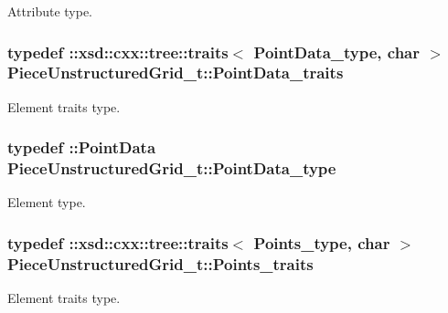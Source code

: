 Attribute type. 

\hypertarget{classPieceUnstructuredGrid__t_aee3c7ac7c46c4ebc9f248d31c458d300}{
\subsubsection[{Point\-Data\-\_\-traits}]{\setlength{\rightskip}{0pt plus 5cm}typedef \-::xsd\-::cxx\-::tree\-::traits$<$ {\bf Point\-Data\-\_\-type}, char $>$ {\bf Piece\-Unstructured\-Grid\-\_\-t\-::\-Point\-Data\-\_\-traits}}}\label{classPieceUnstructuredGrid__t_aee3c7ac7c46c4ebc9f248d31c458d300}


Element traits type. 

\hypertarget{classPieceUnstructuredGrid__t_a5d79d8ea03ca53f80f24e62c2175ec02}{
\subsubsection[{Point\-Data\-\_\-type}]{\setlength{\rightskip}{0pt plus 5cm}typedef \-::{\bf Point\-Data} {\bf Piece\-Unstructured\-Grid\-\_\-t\-::\-Point\-Data\-\_\-type}}}\label{classPieceUnstructuredGrid__t_a5d79d8ea03ca53f80f24e62c2175ec02}


Element type. 

\hypertarget{classPieceUnstructuredGrid__t_abdfd9c9f9eb5f43bd4cfcb2fad6d9f63}{
\subsubsection[{Points\-\_\-traits}]{\setlength{\rightskip}{0pt plus 5cm}typedef \-::xsd\-::cxx\-::tree\-::traits$<$ {\bf Points\-\_\-type}, char $>$ {\bf Piece\-Unstructured\-Grid\-\_\-t\-::\-Points\-\_\-traits}}}\label{classPieceUnstructuredGrid__t_abdfd9c9f9eb5f43bd4cfcb2fad6d9f63}


Element traits type. 

